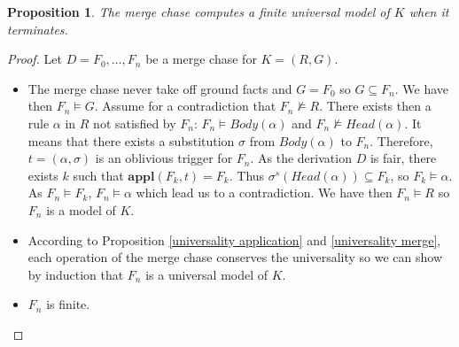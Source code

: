 \documentclass{article}
\newtheorem{proposition}{Proposition}[section]
\theoremstyle{definition}
\newtheorem{definition}{Definition}[section]
\theoremstyle{remark}
\def \N {\mathbb N}
\newcommand{\Vars}{\textbf{Vars}}
\newcommand{\Appl}{\textbf{appl}}
\begin{document}




\begin{proposition} \label{finite <- terminates}
The merge chase computes a finite universal model of $K$ when it terminates.
\end{proposition}

\begin{proof}
Let $D = F_0,\ldots,F_n$ be a merge chase for $K =(R,G)$. 
\begin{itemize}
\item The merge chase never take off ground facts and $G =F_0$ so $G \subseteq F_n$. We have then $F_n \models G$. Assume for a contradiction that $F_n \nvDash R$. There exists then a rule $\alpha$ in $R$ not satisfied by $F_n$: $F_n \vDash \textit{Body}(\alpha)$ and $F_n \nvDash \textit{Head}(\alpha)$. It means that there exists a substitution $\sigma$ from $\textit{Body}(\alpha)$ to $F_n$. Therefore, $t=(\alpha,\sigma)$ is an oblivious trigger for $F_n$. As the derivation $D$ is fair, there exists $k$ such that $\Appl(F_k,t) = F_k$. Thus $\sigma^s(\textit{Head}(\alpha)) \subseteq F_k$, so $F_k \models \alpha$. As $F_n \models F_k$, $F_n \models \alpha$ which lead us to a contradiction. We have then $F_n \models R$ so $F_n$ is a model of $K$.
\item According to Proposition \ref{universality application} and \ref{universality merge}, each operation of the merge chase conserves the universality so we can show by induction that $F_n$ is a universal model of $K$.
\item $F_n$ is finite.
\end{itemize}
\end{proof}
\end{document}
